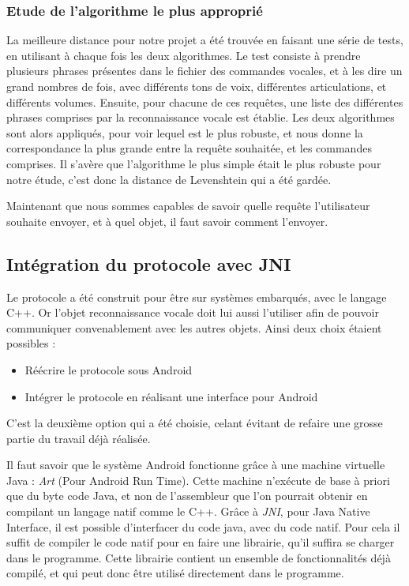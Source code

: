 \subsubsection{Etude de l'algorithme le plus approprié}
La meilleure distance pour notre projet a été trouvée en faisant une série de tests, en utilisant à chaque 
fois les deux algorithmes. Le test consiste à prendre plusieurs phrases présentes dans le fichier des 
commandes vocales, et à les dire un grand nombres de fois, avec différents tons de voix, différentes 
articulations, et différents volumes. Ensuite, pour chacune de ces requêtes, une liste des différentes 
phrases comprises par la reconnaissance vocale est établie. Les deux algorithmes sont alors appliqués, pour 
voir lequel est le plus robuste, et nous donne la correspondance la plus grande entre la requête souhaitée, et 
les commandes comprises. Il s'avère que l'algorithme le plus simple  était le plus robuste pour notre étude, 
c'est donc la distance de Levenshtein qui a été gardée. 

Maintenant que nous sommes capables de savoir quelle requête l'utilisateur souhaite envoyer, et à quel objet, 
il faut savoir comment l'envoyer.

	\subsection{Intégration du protocole avec JNI}
Le protocole a été construit pour être sur systèmes embarqués, avec le langage C++. Or l'objet reconnaissance 
vocale doit lui aussi l'utiliser afin de pouvoir communiquer convenablement avec les autres objets. Ainsi deux 
choix étaient possibles :
\begin{itemize}
 \item Réécrire le protocole sous Android
 \item Intégrer le protocole en réalisant une interface pour Android
\end{itemize}

C'est la deuxième option qui a été choisie, celant évitant de refaire une grosse partie du travail déjà 
réalisée.

Il faut savoir que le système Android fonctionne grâce à une machine virtuelle Java : \emph{Art} (Pour 
Android Run Time). Cette machine n'exécute de base à priori que du byte code Java, et non de l'assembleur que 
l'on pourrait obtenir en compilant un langage natif comme le C++. Grâce à \emph{JNI}, pour Java Native 
Interface, il est possible d'interfacer du code java, avec du code natif. Pour cela il suffit de compiler le 
code natif pour en faire une librairie, qu'il suffira se charger dans le programme. Cette librairie 
contient un ensemble de fonctionnalités déjà compilé, et qui peut donc être utilisé directement dans le 
programme.


